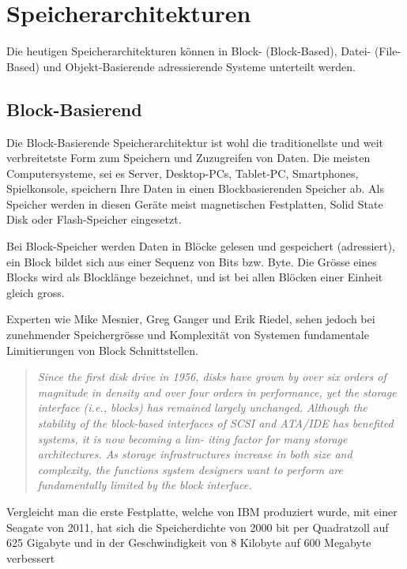 \cleardoublepage
\chapter{Speicherarchitekturen}

Die heutigen Speicherarchitekturen können in Block- (Block-Based), Datei- (File-Based) und Objekt-Basierende adressierende Systeme unterteilt werden.

\section{Block-Basierend}
Die Block-Basierende Speicherarchitektur ist wohl die traditionellste und weit verbreitetste Form zum Speichern und Zuzugreifen von Daten. Die meisten Computersysteme, sei es Server, Desktop-PCs, Tablet-PC, Smartphones, Spielkonsole, speichern Ihre Daten in einen Blockbasierenden Speicher ab. Als Speicher werden in diesen Geräte meist magnetischen Festplatten, Solid State Disk oder Flash-Speicher eingesetzt.

Bei Block-Speicher werden Daten in Blöcke gelesen und gespeichert (adressiert), ein Block bildet sich aus einer Sequenz von Bits bzw. Byte. Die Grösse eines Blocks wird als Blocklänge bezeichnet, und ist bei allen Blöcken einer Einheit gleich gross. 

Experten wie Mike Mesnier, Greg Ganger und Erik Riedel, sehen jedoch bei zunehmender Speichergrösse und Komplexität von Systemen fundamentale Limitierungen von Block Schnittstellen.

\begin{quotation}
\em Since the first disk drive in 1956, disks have grown by over six orders of magnitude in density and over four orders in performance, yet the storage interface (i.e., blocks) has remained largely unchanged. Although the stability of the block-based interfaces of SCSI and ATA/IDE has benefited systems, it is now becoming a lim- iting factor for many storage architectures. As storage infrastructures increase in both size and complexity, the functions system designers want to perform are fundamentally limited by the block interface. \end{quotation}\cite{Mesnier2003}

Vergleicht man die erste Festplatte, welche von IBM produziert wurde, mit einer Seagate von 2011, hat sich die Speicherdichte von 2000 bit per Quadratzoll auf 625 Gigabyte und in der Geschwindigkeit von 8 Kilobyte auf 600 Megabyte verbessert\cite{Seagate2011}\cite{Seagate2011a}

